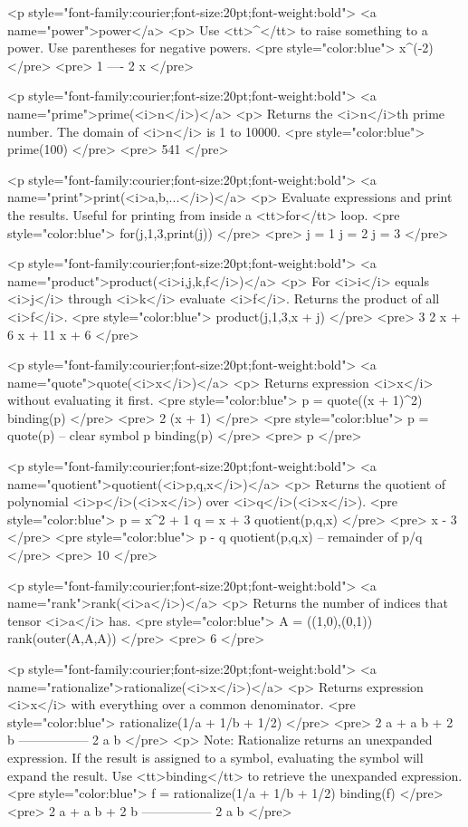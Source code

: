 <p style="font-family:courier;font-size:20pt;font-weight:bold">
<a name="power">power</a>
<p>
Use <tt>^</tt> to raise something to a power.
Use parentheses for negative powers.
<pre style="color:blue">
x^(-2)
</pre>
<pre>
 1
----
  2
 x
</pre>

<p style="font-family:courier;font-size:20pt;font-weight:bold">
<a name="prime">prime(<i>n</i>)</a>
<p>
Returns the <i>n</i>th prime number.
The domain of <i>n</i> is 1 to 10000.
<pre style="color:blue">
prime(100)
</pre>
<pre>
541
</pre>

<p style="font-family:courier;font-size:20pt;font-weight:bold">
<a name="print">print(<i>a,b,...</i>)</a>
<p>
Evaluate expressions and print the results.
Useful for printing from inside a <tt>for</tt> loop.
<pre style="color:blue">
for(j,1,3,print(j))
</pre>
<pre>
j = 1
j = 2
j = 3
</pre>

<p style="font-family:courier;font-size:20pt;font-weight:bold">
<a name="product">product(<i>i,j,k,f</i>)</a>
<p>
For <i>i</i> equals <i>j</i> through <i>k</i> evaluate <i>f</i>.
Returns the product of all <i>f</i>.
<pre style="color:blue">
product(j,1,3,x + j)
</pre>
<pre>
 3      2
x  + 6 x  + 11 x + 6
</pre>

<p style="font-family:courier;font-size:20pt;font-weight:bold">
<a name="quote">quote(<i>x</i>)</a>
<p>
Returns expression <i>x</i> without evaluating it first.
<pre style="color:blue">
p = quote((x + 1)^2)
binding(p)
</pre>
<pre>
       2
(x + 1)
</pre>
<pre style="color:blue">
p = quote(p) -- clear symbol p
binding(p)
</pre>
<pre>
p
</pre>

<p style="font-family:courier;font-size:20pt;font-weight:bold">
<a name="quotient">quotient(<i>p,q,x</i>)</a>
<p>
Returns the quotient of polynomial <i>p</i>(<i>x</i>) over <i>q</i>(<i>x</i>).
<pre style="color:blue">
p = x^2 + 1
q = x + 3
quotient(p,q,x)
</pre>
<pre>
x - 3
</pre>
<pre style="color:blue">
p - q quotient(p,q,x) -- remainder of p/q
</pre>
<pre>
10
</pre>

<p style="font-family:courier;font-size:20pt;font-weight:bold">
<a name="rank">rank(<i>a</i>)</a>
<p>
Returns the number of indices that tensor <i>a</i> has.
<pre style="color:blue">
A = ((1,0),(0,1))
rank(outer(A,A,A))
</pre>
<pre>
6
</pre>

<p style="font-family:courier;font-size:20pt;font-weight:bold">
<a name="rationalize">rationalize(<i>x</i>)</a>
<p>
Returns expression <i>x</i> with everything over a common denominator.
<pre style="color:blue">
rationalize(1/a + 1/b + 1/2)
</pre>
<pre>
 2 a + a b + 2 b
-----------------
      2 a b
</pre>
<p>
Note: Rationalize returns an unexpanded expression.
If the result is assigned to a symbol,
evaluating the symbol will expand the result.
Use <tt>binding</tt> to retrieve the unexpanded expression.
<pre style="color:blue">
f = rationalize(1/a + 1/b + 1/2)
binding(f)
</pre>
<pre>
 2 a + a b + 2 b
-----------------
      2 a b
</pre>

